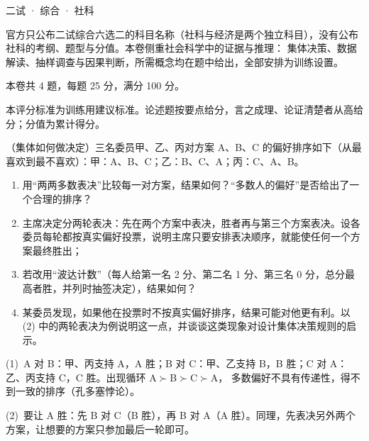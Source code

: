 \documentclass[cjk=noto, seal=first]{mojing-exam}
\begin{document}
\begin{paper}[time={建议 1.5 小时（训练设置）}, full=100]{二试 · 综合 · 社科}

\begin{instructions}
  \item 官方只公布二试综合六选二的科目名称（社科与经济是两个独立科目），没有公布社科的考纲、题型与分值。本卷侧重社会科学中的证据与推理：
        集体决策、数据解读、抽样调查与因果判断，所需概念均在题中给出，全部安排为训练设置。
  \item 本卷共 4 题，每题 25 分，满分 100 分。
\end{instructions}

\begin{gradingnotes}
  \item 本评分标准为训练用建议标准。论述题按要点给分，言之成理、论证清楚者从高给分；分值为累计得分。
\end{gradingnotes}


\begin{questions}

\question[25]
（集体如何做决定）三名委员甲、乙、丙对方案 A、B、C 的偏好排序如下（从最喜欢到最不喜欢）：甲：A、B、C；乙：B、C、A；丙：C、A、B。
\begin{enumerate}
  \item 用“两两多数表决”比较每一对方案，结果如何？“多数人的偏好”是否给出了一个合理的排序？
  \item 主席决定分两轮表决：先在两个方案中表决，胜者再与第三个方案表决。设各委员每轮都按真实偏好投票，说明主席只要安排表决顺序，就能使任何一个方案最终胜出；
  \item 若改用“波达计数”（每人给第一名 2 分、第二名 1 分、第三名 0 分，总分最高者胜，并列时抽签决定），结果如何？
  \item 某委员发现，如果他在投票时不按真实偏好排序，结果可能对他更有利。以 (2) 中的两轮表决为例说明这一点，并谈谈这类现象对设计集体决策规则的启示。
\end{enumerate}
\answerspace{2cm}
\begin{solution}
(1)~A 对 B：甲、丙支持 A，A 胜；B 对 C：甲、乙支持 B，B 胜；C 对 A：乙、丙支持 C，C 胜。出现循环 A$\succ$B$\succ$C$\succ$A，
多数偏好不具有传递性，得不到一致的排序（孔多塞悖论）。

(2)~要让 A 胜：先 B 对 C（B 胜），再 B 对 A（A 胜）。同理，先表决另外两个方案，让想要的方案只参加最后一轮即可。


\end{solution}
\end{questions}
\end{paper}
\end{document}
